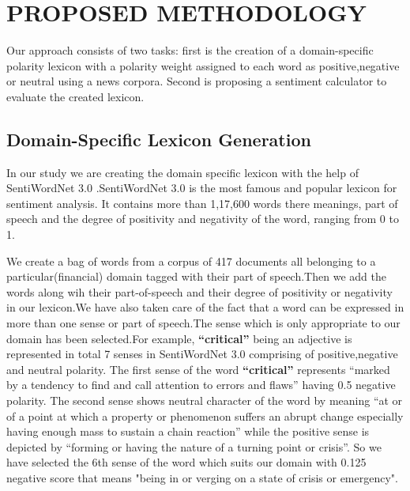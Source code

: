 \documentclass[a4paper, 10pt, conference]{ieeeconf}      %
\begin{document}
\section{PROPOSED METHODOLOGY}
Our approach consists of two tasks: first is the creation of a domain-specific polarity lexicon with a polarity weight assigned to each word as positive,negative or neutral using a news corpora. Second is proposing a sentiment calculator to evaluate the created lexicon.
\subsection{Domain-Specific Lexicon Generation}
In our study we are creating the domain specific lexicon with the help of SentiWordNet 3.0 \cite{c1}.SentiWordNet 3.0 is the most famous and popular lexicon for sentiment analysis. It contains more than 1,17,600 words  there meanings, part of speech  and the degree of positivity and negativity of the word, ranging from 0 to 1.

We create a bag of words from a corpus of 417 documents all belonging to a particular(financial) domain tagged with their part of speech.Then we add the words along wih their part-of-speech and their degree of positivity or negativity in our lexicon.We have also taken care of the fact that a word can be expressed in more than one sense or part of speech.The sense which is only appropriate to our domain has been selected.For example, \textbf{``critical''} being an adjective is represented in total 7 senses in SentiWordNet 3.0 comprising of positive,negative and neutral polarity. The first sense of the word \textbf{``critical''} represents ``marked by a tendency to find and call attention to errors and flaws'' having 0.5 negative polarity. The second sense shows neutral character of the word by meaning ``at or of a point at which a property or phenomenon suffers an abrupt change especially having enough mass to sustain a chain reaction'' while the positive sense is depicted by ``forming or having the nature of a turning point or crisis''. So we have selected the 6th sense of the word which suits our domain with 0.125 negative score that means "being in or verging on a state of crisis or emergency".
\end{document}
